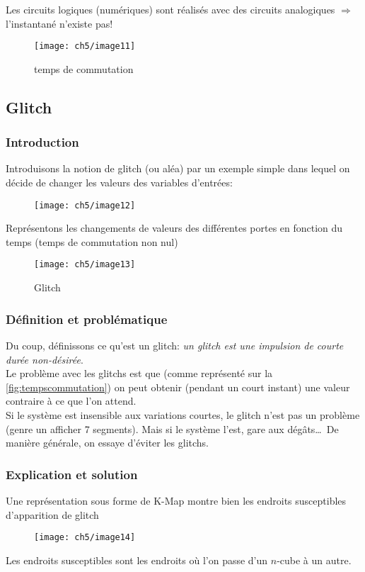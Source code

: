 Les circuits logiques (numériques) sont réalisés avec des circuits analogiques $\Rightarrow$ l'instantané n'existe pas!
\begin{figure}[H]
	\centering
	\texttt{[image: ch5/image11]}
	\caption{temps de commutation}
	\label{fig:tempscommutation}
\end{figure}

\subsection{Glitch}
\subsubsection{Introduction}
Introduisons la notion de glitch (ou aléa) par  un exemple simple dans lequel on décide de changer les valeurs des variables d'entrées:
\begin{figure}[H]
	\centering
	\texttt{[image: ch5/image12]}
\end{figure}
Représentons les changements de valeurs des différentes portes en fonction du temps (temps de commutation non nul)
\begin{figure}[H]
	\centering
	\texttt{[image: ch5/image13]}
	\caption{Glitch}
\end{figure}
\subsubsection{Définition et problématique}
Du coup, définissons ce qu'est un glitch: \textit{un glitch est une impulsion de courte durée non-désirée}.\\

Le problème avec les glitchs est que (comme représenté sur la \autoref{fig:tempscommutation}) on peut obtenir (pendant un court instant) une valeur contraire à ce que l'on attend.\\
Si le système est insensible aux variations courtes, le glitch n'est pas un problème (genre un afficher 7 segments). Mais si le système l'est, gare aux dégâts\dots\ De manière générale, on essaye d'éviter les glitchs.\\
\subsubsection{Explication et solution}
Une représentation sous forme de K-Map montre bien les endroits susceptibles d'apparition de glitch
\begin{figure}[H]
	\centering
	\texttt{[image: ch5/image14]}
\end{figure}
Les endroits susceptibles sont les endroits où l'on passe d'un $n$-cube à un autre.\\

